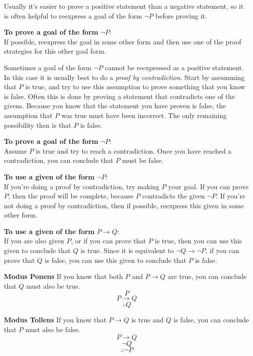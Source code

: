 Usually it's easier to prove a positive statement than a negative statement, so it is often helpful to reexpress a goal of the form $\lnot P$ before proving it.

\textbf{To prove a goal of the form} $\lnot P$:\\
If possible, reexpress the goal in some other form and then use one of the proof strategies for this other goal form.

Sometimes a goal of the form $\lnot P$ cannot be reexpressed as a positive statement. In this case it is usually best to do a \textit{proof by contradiction}. Start by assumming that $P$ is true, and try to use this assumption to prove something that you know is false. Often this is done by proving a statement that contradicts one of the givens. Because you know that the statement you have proven is false, the assumption that $P$ was true must have been incorrect. The only remaining possibility then is that $P$ is false.

\textbf{To prove a goal of the form} $\lnot P$:\\
Assume $P$ is true and try to reach a contradiction. Once you have reached a contradiction, you can conclude that $P$ must be false.

\textbf{To use a given of the form} $\lnot P$:\\
If you're doing a proof by contradiction, try making $P$ your goal. If you can prove $P$, then the proof will be complete, because $P$ contradicts the given $\lnot P$.
If you're not doing a proof by contradiction, then if possible, reexpress this given in some other form.

\textbf{To use a given of the form} $P \rightarrow Q$:\\
If you are also given $P$, or if you can prove that $P$ is true, then you can use this given to conclude that $Q$ is true. Since it is equivalent to $\lnot Q \rightarrow \lnot P$, if you can prove that $Q$ is false, you can use this given to conclude that $P$ is false.

\textbf{Modus Ponens} If you know that both $P$ and $P \rightarrow Q$ are true, you can conclude that $Q$ must also be true.
\[P\]
\[P \rightarrow Q\]
\[\therefore Q\]

\textbf{Modus Tollens} If you know that $P \rightarrow Q$ is true and $Q$ is false, you can conclude that $P$ must also be false.
\[P \rightarrow Q\]
\[\lnot Q\]
\[\therefore \lnot P\]